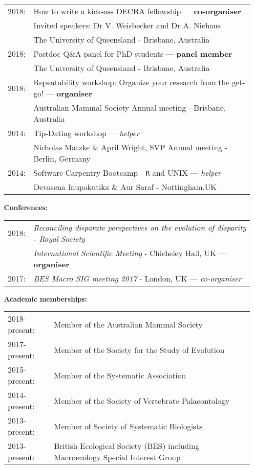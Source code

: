 \documentclass[10pt,a4paper]{article}
\begin{document}
{\begin{tabular}{ll}
2018: & How to write a kick‐ass DECRA fellowship --- \textbf{co-organiser}\\
      & Invited speakers: Dr V. Weisbecker and Dr A. Niehaus\\
      & The University of Queensland - Brisbane, Australia\\
2018: & Postdoc Q\&A panel for PhD students --- \textbf{panel member}\\
      & The University of Queensland - Brisbane, Australia\\
2018: & Repeatability workshop: Organize your research from the get-go! --- \textbf{organiser}\\
      & Australian Mammal Society Annual meeting - Brisbane, Australia\\
2014: & Tip-Dating workshop --- \textit{helper}\\
      & Nicholas Matzke \& April Wright, SVP Annual meeting - Berlin, Germany\\
2014: & Software Carpentry Bootcamp - \texttt{R} and UNIX --- \textit{helper}\\
      & Devasena Inupakutika \& Aur Saraf - Nottingham,UK\\
\end{tabular}

\bigskip

\raggedright\textbf{Conferences:}\\
\begin{tabular}{ll}
2018: & \textit{Reconciling disparate perspectives on the evolution of disparity - Royal Society}\\
      & \textit{International Scientific Meeting} - Chicheley Hall, UK --- \textbf{organiser}\\
2017: & \textit{BES Macro SIG meeting 2017} - London, UK --- \textit{co-organiser}\\
\end{tabular}

\bigskip

\raggedright\textbf{Academic memberships:}
\begin{tabular}{ll}
2018-present: & Member of the Australian Mammal Society\\ 
2017-present: & Member of the Society for the Study of Evolution\\ 
2015-present: & Member of the Systematic Association\\ 
2014-present: & Member of the Society of Vertebrate Palaeontology\\
2013-present: & Member of Society of Systematic Biologists\\
2013-present: & British Ecological Society (BES) including Macroecology Special Interest Group\\
\end{tabular}
\bigskip

}
\end{document}
